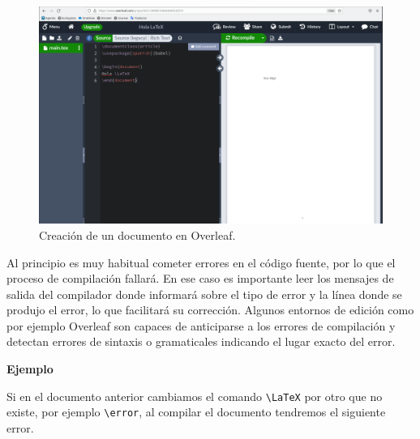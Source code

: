 \documentclass[
  letterpaper,
  DIV=11,
  numbers=noendperiod]{scrreport}
\begin{document}
\begin{figure}

{\centering \includegraphics{./img/introduccion/overleaf-hola-latex.png}

}

\caption{\label{fig-overleaf-hola-latex}Creación de un documento en
Overleaf.}

\end{figure}

Al principio es muy habitual cometer errores en el código fuente, por lo
que el proceso de compilación fallará. En ese caso es importante leer
los mensajes de salida del compilador donde informará sobre el tipo de
error y la línea donde se produjo el error, lo que facilitará su
corrección. Algunos entornos de edición como por ejemplo Overleaf son
capaces de anticiparse a los errores de compilación y detectan errores
de sintaxis o gramaticales indicando el lugar exacto del error.

\textbf{Ejemplo}

Si en el documento anterior cambiamos el comando
\texttt{\textbackslash{}LaTeX} por otro que no existe, por ejemplo
\texttt{\textbackslash{}error}, al compilar el documento tendremos el
siguiente error.
\end{document}
